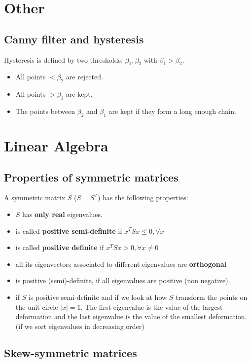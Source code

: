 \section{Other}


\subsection{Canny filter and hysteresis}

Hysteresis is defined by two thresholds: $\beta_1, \beta_2$ with $\beta_1 > \beta_2$.
\begin{itemize}
    \item All points $< \beta_2$ are rejected.
    \item All points $> \beta_1$ are kept.
    \item The points between $\beta_2$ and $\beta_1$ are kept if they form a long enough chain.
\end{itemize}

\section{Linear Algebra}
\subsection{Properties of symmetric matrices}
A symmetric matrix $S$ ($S = S^T$) has the following properties:
\begin{itemize}
    \item $S$ has \textbf{only real} eigenvalues.
    \item is called \textbf{positive semi-definite} if $x^TSx \leq 0, \forall x$
    \item is called \textbf{positive definite} if $x^TSx > 0, \forall x \neq 0$
    \item all its eigenvectors associated to different eigenvalues are \textbf{orthogonal}
    \item is positive (semi)-definite, if all eigenvalues are positive (non negative).
    \item if $S$ is positive semi-definite and if we look at how $S$ transform the points on the unit circle $|x|=1$. The first eigenvalue is the value of the largest deformation and the last eigenvalue is the value of the smallest deformation. (if we sort eigenvalues in decreasing order)
\end{itemize}

\subsection{Skew-symmetric matrices}

